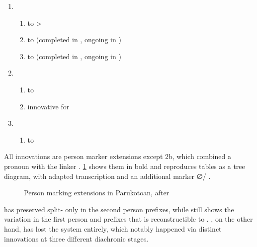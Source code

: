 \begin{enumerate}
	\item \PPar \begin{enumerate}
		\item {}  to >
		\item {}  to  (completed in \PWai, ongoing in \kaxui)
		\item {}  to  (completed in \PWai, ongoing in \kaxui)
	\end{enumerate}
	\item \PWai \begin{enumerate}
		\item {}  to 
		\item innovative   for 
	\end{enumerate}
	\item \waiwai \begin{enumerate}
		\item {}  to \end{enumerate}
\end{enumerate}
%
All innovations are person marker extensions except 2b, which combined a pronoun with the linker .
\cref{fig:par_ext} shows them in bold and reproduces  tables as a tree diagram, with adapted transcription and an additional \kaxui {} marker ∅/ .
%
\begin{figure}[hbt]
	\centering
	\setlength{\tabcolsep}{2pt}
	\caption{Person marking extensions in Parukotoan, after \textcite[94]{gildea1998}}
	\label{fig:par_ext}
\end{figure}
%
\hixka has preserved split- only in the second person prefixes, while \kaxui still shows the variation in the first person and  prefixes that is reconstructible to \PPar.
\waiwai, on the other hand, has lost the system entirely, which notably happened via distinct innovations at three different diachronic stages.



